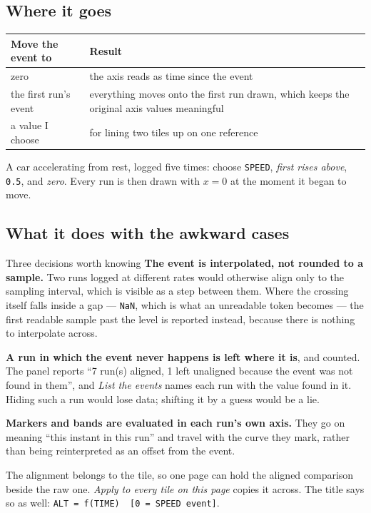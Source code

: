 \documentclass[11pt,a4paper,oneside]{report}
\newcommand{\code}[1]{\texttt{#1}}
\begin{document}
\subsection*{Where it goes}

\begin{longtable}{@{}p{}p{}@{}}
\toprule
\textbf{Move the event to} & \textbf{Result} \\
\midrule
\endhead
zero & the axis reads as time since the event \\
the first run's event & everything moves onto the first run drawn, which keeps
the original axis values meaningful \\
a value I choose & for lining two tiles up on one reference \\
\bottomrule
\end{longtable}

A car accelerating from rest, logged five times: choose \code{SPEED},
\emph{first rises above}, \code{0.5}, and \emph{zero}. Every run is then drawn
with $x = 0$ at the moment it began to move.

\subsection*{What it does with the awkward cases}

\begin{aoenote}{Three decisions worth knowing}
\textbf{The event is interpolated, not rounded to a sample.} Two runs logged at
different rates would otherwise align only to the sampling interval, which is
visible as a step between them. Where the crossing itself falls inside a gap
--- \code{NaN}, which is what an unreadable token becomes --- the first
readable sample past the level is reported instead, because there is nothing to
interpolate across.

\textbf{A run in which the event never happens is left where it is}, and
counted. The panel reports ``7 run(s) aligned, 1 left unaligned because the
event was not found in them'', and \emph{List the events} names each run with
the value found in it. Hiding such a run would lose data; shifting it by a
guess would be a lie.

\textbf{Markers and bands are evaluated in each run's own axis.} They go on
meaning ``this instant in this run'' and travel with the curve they mark,
rather than being reinterpreted as an offset from the event.
\end{aoenote}

The alignment belongs to the tile, so one page can hold the aligned comparison
beside the raw one. \emph{Apply to every tile on this page} copies it across.
The title says so as well: \code{ALT = f(TIME)~~[0 = SPEED event]}.
\end{document}
